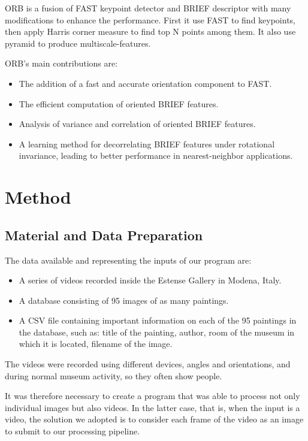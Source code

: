 \documentclass[10pt,twocolumn,letterpaper]{article}
\begin{document}
ORB is a fusion of FAST keypoint detector and BRIEF descriptor with many modifications to enhance the performance. First it use FAST to find keypoints, then apply Harris corner measure to find top N points among them. It also use pyramid to produce multiscale-features.

ORB's main contributions are:
\begin{itemize}
   \item The addition of a fast and accurate orientation component to FAST.
   \item The efficient computation of oriented BRIEF features.
   \item Analysis of variance and correlation of oriented BRIEF features.
   \item A learning method for decorrelating BRIEF features under rotational invariance, leading to better performance in nearest-neighbor applications.
\end{itemize}
 

\section{Method}

\subsection{Material and Data Preparation}

The data available and representing the inputs of our program are:
\begin{itemize}
   \item A series of videos recorded inside the Estense Gallery in Modena, Italy.
   \item A database consisting of 95 images of as many paintings.
   \item A CSV file containing important information on each of the 95 paintings in the database, such as: title of the painting, author, room of the museum in which it is located, filename of the image.
\end{itemize}

The videos were recorded using different devices, angles and orientations, and during normal museum activity, so they often show people.

It was therefore necessary to create a program that was able to process not only individual images but also videos.
In the latter case, that is, when the input is a video, the solution we adopted is to consider each frame of the video as an image to submit to our processing pipeline.
\end{document}
